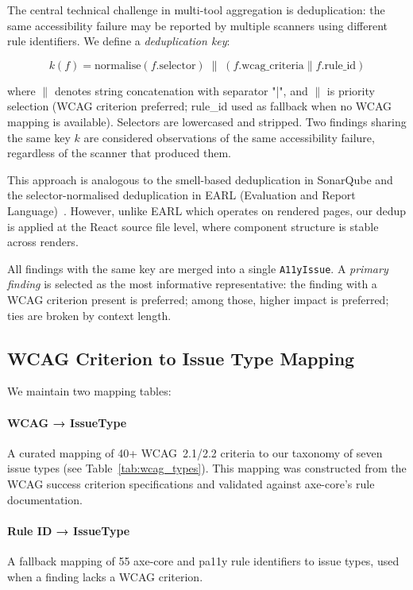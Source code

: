 \documentclass[10pt,conference]{IEEEtran}
\begin{document}
The central technical challenge in multi-tool aggregation is deduplication:
the same accessibility failure may be reported by multiple scanners using
different rule identifiers.  We define a \emph{deduplication key}:

\begin{equation}
  k(f) = \text{normalise}(f.\text{selector}) \;\|\; (f.\text{wcag\_criteria} \parallel f.\text{rule\_id})
  \label{eq:dedup}
\end{equation}

where $\|$ denotes string concatenation with separator "|", and $\parallel$
is priority selection (WCAG criterion preferred; rule\_id used as fallback
when no WCAG mapping is available).  Selectors are lowercased and stripped.
Two findings sharing the same key $k$ are considered observations of the
same accessibility failure, regardless of the scanner that produced them.

This approach is analogous to the smell-based deduplication in SonarQube
\cite{sonarqube} and the selector-normalised deduplication in EARL
(Evaluation and Report Language)~\cite{earl}.  However, unlike EARL which
operates on rendered pages, our dedup is applied at the React source file
level, where component structure is stable across renders.

All findings with the same key are merged into a single \texttt{A11yIssue}.
A \emph{primary finding} is selected as the most informative representative:
the finding with a WCAG criterion present is preferred; among those,
higher impact is preferred; ties are broken by context length.

\subsection{WCAG Criterion to Issue Type Mapping}

We maintain two mapping tables:

\paragraph{WCAG → IssueType} A curated mapping of 40+ WCAG~2.1/2.2 criteria
to our taxonomy of seven issue types (see Table~\ref{tab:wcag_types}).
This mapping was constructed from the WCAG success criterion specifications
\cite{wcag21} and validated against axe-core's rule documentation.

\paragraph{Rule ID → IssueType} A fallback mapping of 55 axe-core and pa11y
rule identifiers to issue types, used when a finding lacks a WCAG criterion.
\end{document}
